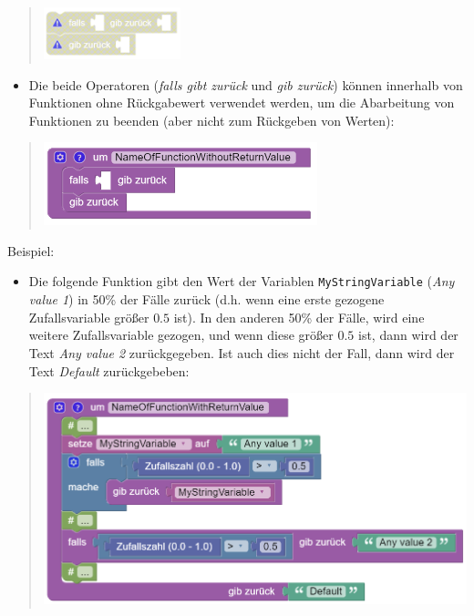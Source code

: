 \documentclass[
  letterpaper,
  DIV=11]{scrreprt}
\providecommand{\tightlist}{%
  \setlength{\itemsep}{0pt}\setlength{\parskip}{0pt}}\usepackage{longtable,booktabs,array}
\begin{document}
\begin{tcolorbox}
\begin{quote}
\includegraphics[width=1.5625in,height=\textheight]{img/screenshot-blockly-function-return-operator-outside-functions-example-01-DEU.png}
\end{quote}

\begin{itemize}
\tightlist
\item
  Die beide Operatoren (\emph{falls gibt zurück} und \emph{gib zurück})
  können innerhalb von Funktionen ohne Rückgabewert verwendet werden, um
  die Abarbeitung von Funktionen zu beenden (aber nicht zum Rückgeben
  von Werten):
\end{itemize}

\begin{quote}
\includegraphics[width=3.125in,height=\textheight]{img/screenshot-blockly-function-return-operator-in-functions-without-return-value-example-01-DEU.png}
\end{quote}

Beispiel:

\begin{itemize}
\tightlist
\item
  Die folgende Funktion gibt den Wert der Variablen
  \texttt{MyStringVariable} (\emph{Any value 1}) in 50\% der Fälle
  zurück (d.h. wenn eine erste gezogene Zufallsvariable größer \(0.5\)
  ist). In den anderen 50\% der Fälle, wird eine weitere Zufallsvariable
  gezogen, und wenn diese größer \(0.5\) ist, dann wird der Text
  \emph{Any value 2} zurückgegeben. Ist auch dies nicht der Fall, dann
  wird der Text \emph{Default} zurückgebeben:
\end{itemize}

\begin{quote}
\includegraphics[width=5.20833in,height=\textheight]{img/screenshot-blockly-function-return-operator-real-life-example-01-DEU.png}
\end{quote}


\end{tcolorbox}
\end{document}
